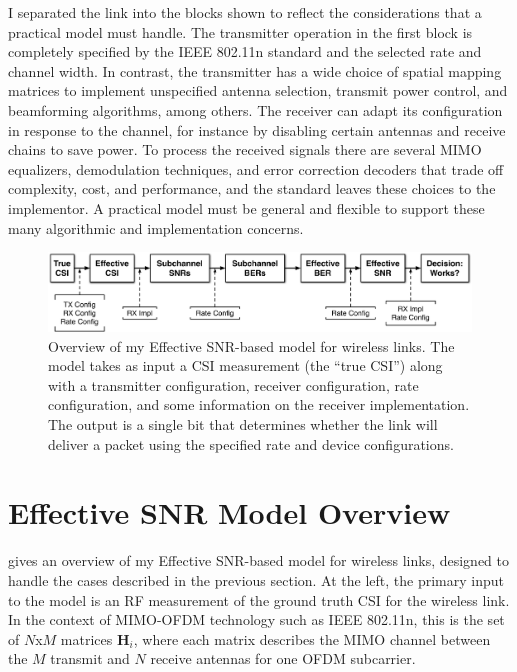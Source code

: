 I separated the link into the blocks shown to reflect the considerations that a practical model must handle. The transmitter operation in the first block is completely specified by the IEEE 802.11n standard and the selected rate and channel width. In contrast, the transmitter has a wide choice of spatial mapping matrices to implement unspecified antenna selection, transmit power control, and beamforming algorithms, among others. The receiver can adapt its configuration in response to the channel, for instance by disabling certain antennas and receive chains to save power. To process the received signals there are several MIMO equalizers, demodulation techniques, and error correction decoders that trade off complexity, cost, and performance, and the standard leaves these choices to the implementor. A practical model must be general and flexible to support these many algorithmic and implementation concerns.

\begin{figure}[ht]
\centering
\includegraphics[width=\textwidth]{figures/esnr_model_overview.pdf}
\caption[Model overview]{\label{fig:model_overview}Overview of my Effective SNR-based model for wireless links. The model takes as input a CSI measurement (the ``true CSI'') along with a transmitter configuration, receiver configuration, rate configuration, and some information on the receiver implementation. The output is a single bit that determines whether the link will deliver a packet using the specified rate and device configurations.}
\end{figure}

\section{Effective SNR Model Overview}
\label{sec:model_overview}
 gives an overview of my Effective SNR-based model for wireless links, designed to handle the cases described in the previous section. At the left, the primary input to the model is an RF measurement of the ground truth CSI for the wireless link. In the context of MIMO-OFDM technology such as IEEE 802.11n, this is the set of $N$x$M$ matrices $\mathbf{H}_i$, where each matrix describes the MIMO channel between the $M$ transmit and $N$ receive antennas for one OFDM subcarrier.

